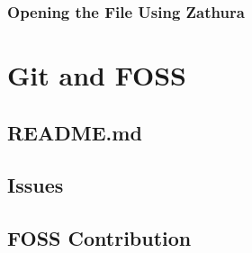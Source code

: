 \documentclass{article}
\begin{document}
\subsubsection{Opening the File Using Zathura}

\section{Git and FOSS}
\subsection{README.md}

\subsection{Issues}

\subsection{FOSS Contribution}
\end{document}
